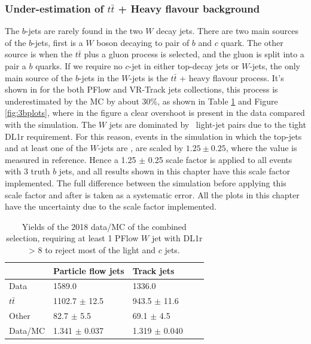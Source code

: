 \documentclass[letterpaper,12pt]{article}
\begin{document}
\subsubsection{Under-estimation of $t\bar{t}$ + Heavy flavour background }
The $b$-jets are rarely found in the two $W$ decay jets. There are two main sources of 
the $b$-jets, first is a $W$ boson decaying to pair of $b$ and $c$ quark. The other 
source is when the $t\bar{t}$ plus a gluon process is selected, and the gluon is split 
into a pair a $b$ quarks. If we require no $c$-jet in either top-decay jets or $W$-jets, 
the only main source of the $b$-jets in the $W$-jets is the $t\bar{t}$ + heavy flavour 
process. It's shown in for the both PFlow and VR-Track jets collections, this process is 
underestimated by the MC by about 30\%, as shown in Table \ref{tab:3byields1} 
and Figure \ref{fig:3bplots}, where in the figure a clear overshoot is present in the data
compared with the simulation. The $W$ jets are dominated by \bjet\ light-jet pairs due to the tight
DL1r requirement.
For this reason, events in the simulation
in which the top-jets and at least one of the $W$-jets are \bjets, are
scaled by $1.25 \pm 0.25$, where the value is measured in reference\cite{TOPQ-2017-12}.
Hence a 1.25 $\pm$ 0.25 scale factor is applied to all events with 3 truth $b$ jets, 
and all results shown in this chapter have this scale factor implemented. 
The full difference between the simulation before applying this scale factor and 
after is taken as a systematic error. All the plots in this chapter have the 
uncertainty due to the scale factor implemented. 




\begin{table}[]
    \centering
	\begin{tabular}{|l|ll|ll|}
		\hline
		& Particle flow jets & Track jets \\
		\hline
        Data & 1589.0 &  1336.0 \\
         $t\bar{t}$ & 1102.7 $\pm$ 12.5  & 943.5 $\pm$ 11.6 \\
         Other & 82.7 $\pm$ 5.5 &   69.1 $\pm$ 4.5 \\
		 Data/MC & 1.341 $\pm$ 0.037 &  1.319 $\pm$ 0.040 \\
		 \hline
    \end{tabular}
	\caption{Yields of the 2018 data/MC of the combined selection, 
	requiring at least 1 PFlow $W$ jet with DL1r > 8 to 
	reject most of the light and $c$ jets.}
    \label{tab:3byields1}
\end{table}
\end{document}
